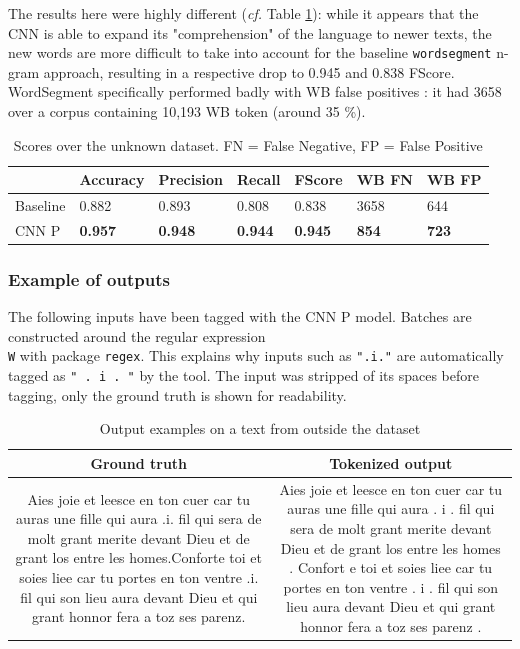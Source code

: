 \documentclass{jdmdh}
\begin{document}
The results here were highly different (\textit{cf.} Table \ref{tab:scores_unknown}): while it appears that the CNN is able to expand its "comprehension" of the language to newer texts, the new words are more difficult to take into account for the baseline \texttt{wordsegment} n-gram approach, resulting in a respective drop to 0.945 and 0.838 FScore. WordSegment specifically performed badly with WB false positives : it had 3658 over a corpus containing 10,193 WB token (around 35 \%).

\begin{table}[!ht]
\centering
\begin{tabular}{lllllll}
\hline
 & Accuracy & Precision & Recall & FScore & WB FN & WB FP \\ \hline
Baseline & 0.882 & 0.893 & 0.808 & 0.838 & 3658 & 644 \\
CNN P & \textbf{0.957} & \textbf{0.948} & \textbf{0.944} & \textbf{0.945} & \textbf{854} & \textbf{723} \\ \hline
\end{tabular}
\caption{Scores over the unknown dataset. FN = False Negative, FP = False Positive}
\label{tab:scores_unknown}
\end{table}

\subsubsection{Example of outputs}

The following inputs have been tagged with the CNN P model. Batches are constructed around the regular expression \texttt{\\W} with package \texttt{regex}. This explains why inputs such as \texttt{".i."} are automatically tagged as \texttt{" . i . "} by the tool. The input was stripped of its spaces before tagging, only the ground truth is shown for readability.

\begin{table}[!ht]
\centering
\begin{tabularx}{\textwidth}{|C|C|}
\hline
\textbf{Ground truth} & \textbf{Tokenized output} \\\hline
Aies joie et leesce en ton cuer car tu auras une fille qui aura .i. fil qui sera de molt grant merite devant Dieu et de grant los entre les homes.Conforte toi et soies liee car tu portes en ton ventre .i. fil qui son lieu aura devant Dieu et qui grant honnor fera a toz ses parenz. & Aies joie et leesce en ton cuer car tu auras une fille qui aura .  i .  fil qui sera de molt grant merite devant Dieu et de grant los entre les homes .  Confort e toi et soies liee car tu portes en ton ventre .  i .  fil qui son lieu aura devant Dieu et qui grant honnor fera a toz ses parenz .
\\\hline
\end{tabularx}
\caption{Output examples on a text from outside the dataset}
\label{tab:example_output}
\end{table}
\end{document}
